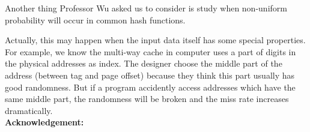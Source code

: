 \documentclass{article}
\newcommand{\Acknowledgement}[1]{\ \\{\bf Acknowledgement:} #1}
\begin{document}
\begin{spacing}{1.1}
    Another thing Professor Wu asked us to consider is study when non-uniform probability will occur in common hash functions.

    Actually, this may happen when the input data itself has some special properties. For example, we know the multi-way cache in computer uses a part of digits in the physical addresses as index. The designer choose the middle part of the address (between tag and page offset) because they think this part usually has good randomness. But if a program accidently access addresses which have the same middle part, the randomness will be broken and the miss rate increases dramatically.
    \Acknowledgement{}


    \end{spacing}
    
\end{document}
